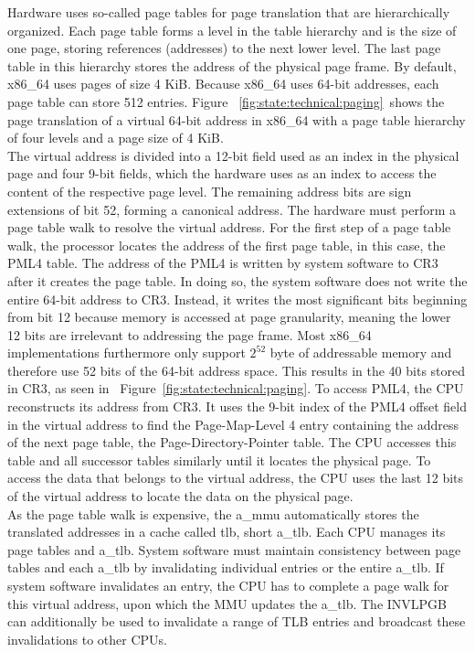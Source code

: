 Hardware uses so-called page tables for page translation that are hierarchically
organized. Each page table forms a level in the table hierarchy and is the size
of one page, storing references (addresses) to the next lower level. The last
page table in this hierarchy stores the address of the physical page frame. By
default, x86\_64 uses pages of size 4 KiB. Because x86\_64 uses 64-bit
addresses, each page table can store 512 entries. Figure
~\ref{fig:state:technical:paging}~shows the page translation of a virtual 64-bit
address in x86\_64 with a page table hierarchy of four levels and a page size of
4 KiB. \\

The virtual address is divided into a 12-bit field used as an index in the
physical page and four 9-bit fields, which the hardware uses as an index to
access the content of the respective page level. The remaining address bits are
sign extensions of bit 52, forming a canonical address. The hardware must
perform a page table walk to resolve the virtual address. For the first step of
a page table walk, the processor locates the address of the first page table, in
this case, the PML4 table. The address of the PML4 is written by system software
to CR3 after it creates the page table. In doing so, the system software does
not write the entire 64-bit address to CR3. Instead, it writes the most
significant bits beginning from bit 12 because memory is accessed at page
granularity, meaning the lower 12 bits are irrelevant to addressing the page
frame. Most x86\_64 implementations furthermore only support $2^{52}$ byte of
addressable memory and therefore use 52 bits of the 64-bit address space. This
results in the 40 bits stored in CR3, as seen in
~Figure~\ref{fig:state:technical:paging}. To access PML4, the CPU reconstructs
its address from CR3. It uses the 9-bit index of the PML4 offset field in the
virtual address to find the Page-Map-Level 4 entry containing the address of the
next page table, the Page-Directory-Pointer table. The CPU accesses this table
and all successor tables similarly until it locates the physical page. To access
the data that belongs to the virtual address, the CPU uses the last 12 bits of
the virtual address to locate the data on the physical page. \\

As the page table walk is expensive, the \acrshort{a_mmu} automatically stores
the translated addresses in a cache called \gls{tlb}, short \acrshort{a_tlb}.
Each CPU manages its page tables and \acrshort{a_tlb}. System software must
maintain consistency between page tables and each \acrshort{a_tlb} by
invalidating individual entries or the entire \acrshort{a_tlb}. If system
software invalidates an entry, the CPU has to complete a page walk for this
virtual address, upon which the MMU updates the \acrshort{a_tlb}. The INVLPGB
can additionally be used to invalidate a range of TLB entries and broadcast
these invalidations to other CPUs. \\

